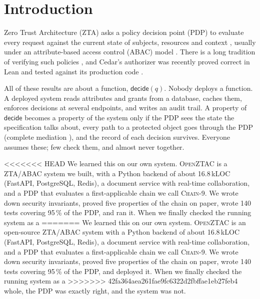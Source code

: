 \documentclass[sigconf,review,anonymous]{acmart}
\newcommand{\sysname}{\textsc{OpenZTAC}\xspace}
\newcommand{\sysname}{\textsc{Atrium}\xspace}
\newcommand{\sysname}{\textsc{OpenZTAC}\xspace}
\newcommand{\chain}{\textsc{Chain-9}\xspace}
\newcommand{\decide}{\mathsf{decide}}
\begin{document}
\maketitle

\section{Introduction}

Zero Trust Architecture (ZTA) asks a policy decision point (PDP) to evaluate every request against the current
state of subjects, resources and context \cite{rose2020zta,chandramouli2023sp800207a,kerman2025sp180035}, usually
under an attribute-based access control (ABAC) model \cite{hu2014sp800162,jin2012abac}. There is a long tradition
of verifying such policies \cite{fisler2005margrave,turkmen2017xacmlsmt,backes2018zelkova,hu2011anomaly}, and
Cedar's authorizer was recently proved correct in Lean and tested against its production code
\cite{cutler2024cedar,disselkoen2024vgd}.

All of these results are about a function, $\decide(q)$. Nobody deploys a function. A deployed system reads
attributes and grants from a database, caches them, enforces decisions at several endpoints, and writes an audit
trail. A property of $\decide$ becomes a property of the system only if the PDP sees the state the specification
talks about, every path to a protected object goes through the PDP (complete mediation
\cite{saltzer1975protection}), and the record of each decision survives. Everyone assumes these; few check them,
and almost never together.

<<<<<<< HEAD
We learned this on our own system. \sysname is a ZTA/ABAC system we built, with a Python backend of about
16.8\,kLOC (FastAPI, PostgreSQL, Redis), a document service with real-time collaboration, and a PDP that evaluates
a first-applicable chain we call \chain. We wrote down security invariants, proved five properties of the chain on
paper, wrote 140 tests covering 95\,\% of the PDP, and ran it. When we finally checked the running system as a
=======
We learned this on our own system. \sysname is an open-source ZTA/ABAC system with a Python backend of about
16.8\,kLOC (FastAPI, PostgreSQL, Redis), a document service with real-time collaboration, and a PDP that evaluates
a first-applicable chain we call \chain. We wrote down security invariants, proved five properties of the chain on
paper, wrote 140 tests covering 95\,\% of the PDP, and deployed it. When we finally checked the running system as a
>>>>>>> 42fa364aea261fae9fc6322d2fbffae1eb27feb4
whole, the PDP was exactly right, and the system was not.
\end{document}
